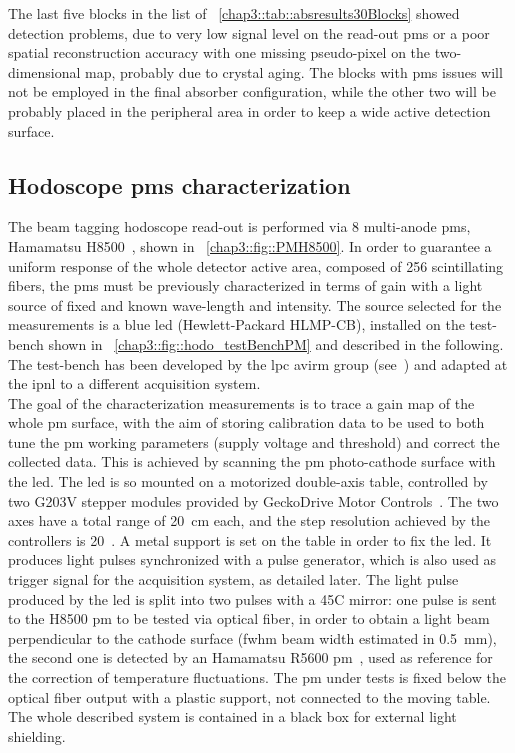 The last five blocks in the list of \tablename~\ref{chap3::tab::absresults30Blocks} showed detection problems, due to very low signal level on the read-out \glspl{pm} or a poor spatial reconstruction accuracy with one missing pseudo-pixel on the two-dimensional map, probably due to crystal aging. The blocks with \glspl{pm} issues will not be employed in the final absorber configuration, while the other two will be probably placed in the peripheral area in order to keep a wide active detection surface.   


\subsection{Hodoscope \glspl{pm} characterization}\label{chap3::subsec::hodoPMchar}         

The beam tagging hodoscope read-out is performed via 8 multi-anode \glspl{pm}, Hamamatsu H8500~\parencite{Hamamatsu2006}, shown in \figurename~\ref{chap3::fig::PMH8500}. In order to guarantee a uniform response of the whole detector active area, composed of 256 scintillating fibers, the \glspl{pm} must be previously characterized in terms of gain with a light source of fixed and known wave-length and intensity. The source selected for the measurements is a blue \gls{led} (Hewlett-Packard HLMP-CB), installed on the test-bench shown in \figurename~\ref{chap3::fig::hodo_testBenchPM} and described in the following. The test-bench has been developed by the \gls{lpc} \gls{avirm} group (see~\cite{Gaglione2013}) and adapted at the \gls{ipnl} to a different acquisition system.\\
The goal of the characterization measurements is to trace a gain map of the whole \gls{pm} surface, with the aim of storing calibration data to be used to both tune the \gls{pm} working parameters (supply voltage and threshold) and correct the collected data. This is achieved by scanning the \gls{pm} photo-cathode surface with the \gls{led}. The \gls{led} is so mounted on a motorized double-axis table, controlled by two G203V stepper modules provided by GeckoDrive Motor Controls~\parencite{GeckoDrive2010}. The two axes have a total range of 20~cm each, and the step resolution achieved by the controllers is 20~\charmum. A metal support is set on the table in order to fix the \gls{led}. It produces light pulses synchronized with a pulse generator, which is also used as trigger signal for the acquisition system, as detailed later. The light pulse produced by the \gls{led} is split into two pulses with a 45\textdegree{}C mirror: one pulse is sent to the H8500 \gls{pm} to be tested via optical fiber, in order to obtain a light beam perpendicular to the cathode surface (\gls{fwhm} beam width estimated in 0.5~mm), the second one is detected by an Hamamatsu R5600 \gls{pm}~\parencite{Hamamatsu1995}, used as reference for the correction of temperature fluctuations. The \gls{pm} under tests is fixed below the optical fiber output with a plastic support, not connected to the moving table. The whole described system is contained in a black box for external light shielding.\\
